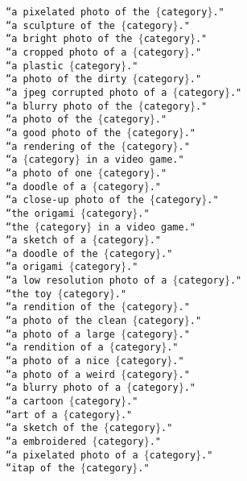 \documentclass[10pt,twocolumn,letterpaper]{article}
\begin{document}
{    \texttt{``a pixelated photo of the $\{$category$\}$."}\\
    \texttt{``a sculpture of the $\{$category$\}$."}\\
    \texttt{``a bright photo of the $\{$category$\}$."}\\
    \texttt{``a cropped photo of a $\{$category$\}$."}\\
    \texttt{``a plastic $\{$category$\}$."}\\
    \texttt{``a photo of the dirty $\{$category$\}$."}\\
    \texttt{``a jpeg corrupted photo of a $\{$category$\}$."}\\
    \texttt{``a blurry photo of the $\{$category$\}$."}\\
    \texttt{``a photo of the $\{$category$\}$."}\\
    \texttt{``a good photo of the $\{$category$\}$."}\\
    \texttt{``a rendering of the $\{$category$\}$."}\\
    \texttt{``a $\{$category$\}$ in a video game."}\\
    \texttt{``a photo of one $\{$category$\}$."}\\
    \texttt{``a doodle of a $\{$category$\}$."}\\
    \texttt{``a close-up photo of the $\{$category$\}$."}\\
    \texttt{``the origami $\{$category$\}$."}\\
    \texttt{``the $\{$category$\}$ in a video game."}\\
    \texttt{``a sketch of a $\{$category$\}$."}\\
    \texttt{``a doodle of the $\{$category$\}$."}\\
    \texttt{``a origami $\{$category$\}$."}\\
    \texttt{``a low resolution photo of a $\{$category$\}$."}\\
    \texttt{``the toy $\{$category$\}$."}\\
    \texttt{``a rendition of the $\{$category$\}$."}\\
    \texttt{``a photo of the clean $\{$category$\}$."}\\
    \texttt{``a photo of a large $\{$category$\}$."}\\
    \texttt{``a rendition of a $\{$category$\}$."}\\
    \texttt{``a photo of a nice $\{$category$\}$."}\\
    \texttt{``a photo of a weird $\{$category$\}$."}\\
    \texttt{``a blurry photo of a $\{$category$\}$."}\\
    \texttt{``a cartoon $\{$category$\}$."}\\
    \texttt{``art of a $\{$category$\}$."}\\
    \texttt{``a sketch of the $\{$category$\}$."}\\
    \texttt{``a embroidered $\{$category$\}$."}\\
    \texttt{``a pixelated photo of a $\{$category$\}$."}\\
    \texttt{``itap of the $\{$category$\}$."}\\
}
\end{document}
